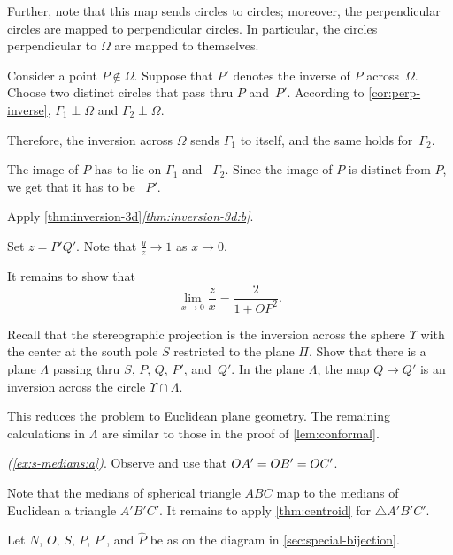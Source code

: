 \begin{multicols}{2}
Further, note that this map sends circles to circles;
moreover, the perpendicular circles are mapped to perpendicular circles.
In particular, the circles perpendicular to $\Omega$ are mapped to themselves.

Consider a point $P\notin\Omega$.
Suppose that $P'$ denotes the inverse of $P$ across~$\Omega$.
Choose two distinct circles that pass thru $P$ and~$P'$.
According to \ref{cor:perp-inverse}, 
$\Gamma_1\perp \Omega$ and $\Gamma_2\perp \Omega$.

Therefore, the inversion across $\Omega$ sends $\Gamma_1$ to itself, and the same holds for~$\Gamma_2$. 

The image of $P$ has to lie on $\Gamma_1$ and ~$\Gamma_2$.
Since the image of $P$ is distinct from $P$, we get that it has to be ~$P'$.

Apply \ref{thm:inversion-3d}\textit{\ref{thm:inversion-3d:b}}.

Set $z=P'Q'$.
Note that $\tfrac yz\to 1$ as $x\to 0$.

It remains to show that 
$$\lim_{x\to 0} \frac{z}{x}=\frac{2}{1+OP^2}.$$

Recall that the stereographic projection is the inversion across the sphere $\Upsilon$ with the center at the south pole $S$ restricted to the plane $\Pi$.
Show that there is a plane $\Lambda$ passing thru $S$, $P$, $Q$, $P'$, and~$Q'$.
In the plane $\Lambda$, the map $Q\mapsto Q'$ is an inversion across the circle $\Upsilon\cap \Lambda$.

This reduces the problem to Euclidean plane geometry.
The remaining calculations in $\Lambda$ are similar to those in the proof of \ref{lem:conformal}.

\textit{(\ref{ex:s-medians:a})}.
Observe and use that 
$OA'\z=OB'\z=OC'$.

 Note that the medians of spherical triangle $ABC$ 
map to the medians of Euclidean a triangle $A'B'C'$.
It remains to apply \ref{thm:centroid} for $\triangle A'B'C'$.

\setcounter{eqtn}{0}

Let $N$, $O$, $S$, $P$, $P'$, and $\hat P$ 
be as on the diagram in \ref{sec:special-bijection}.


\end{multicols}
